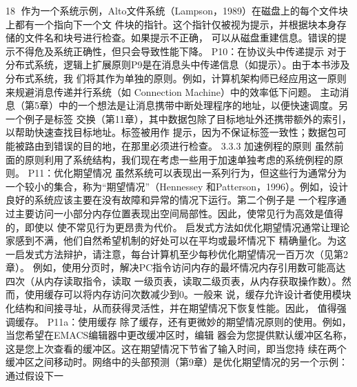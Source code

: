                                                   18
作为一个系统示例，Alto文件系统（Lampson，1989）在磁盘上的每个文件块上都有一个指向下一个文
件块的指针。这个指针仅被视为提示，并根据块本身存储的文件名和块号进行检查。如果提示不正确，
可以从磁盘重建信息。错误的提示不得危及系统正确性，但只会导致性能下降。
P10：在协议头中传递提示
对于分布式系统，逻辑上扩展原则P9是在消息头中传递信息（如提示）。由于本书涉及分布式系统，我
们将其作为单独的原则。例如，计算机架构师已经应用这一原则来规避消息传递并行系统（如
Connection Machine）中的效率低下问题。
主动消息（第5章）中的一个想法是让消息携带中断处理程序的地址，以便快速调度。另一个例子是标签
交换（第11章），其中数据包除了目标地址外还携带额外的索引，以帮助快速查找目标地址。标签被用作
提示，因为不保证标签一致性；数据包可能被路由到错误的目的地，在那里必须进行检查。
3.3.3 加速例程的原则
虽然前面的原则利用了系统结构，我们现在考虑一些用于加速单独考虑的系统例程的原则。
P11：优化期望情况
虽然系统可以表现出一系列行为，但这些行为通常分为一个较小的集合，称为“期望情况”（Hennessey
和Patterson，1996）。例如，设计良好的系统应该主要在没有故障和异常的情况下运行。第二个例子是
一个程序通过主要访问一小部分内存位置表现出空间局部性。因此，使常见行为高效是值得的，即使以
使不常见行为更昂贵为代价。
启发式方法如优化期望情况通常让理论家感到不满，他们自然希望机制的好处可以在平均或最坏情况下
精确量化。为这一启发式方法辩护，请注意，每台计算机至少每秒优化期望情况一百万次（见第2章）。
例如，使用分页时，解决PC指令访问内存的最坏情况内存引用数可能高达四次（从内存读取指令，读取
一级页表，读取二级页表，从内存获取操作数）。然而，使用缓存可以将内存访问次数减少到0。一般来
说，缓存允许设计者使用模块化结构和间接寻址，从而获得灵活性，并在期望情况下恢复性能。因此，
值得强调缓存。
P11a：使用缓存
除了缓存，还有更微妙的期望情况原则的使用。例如，当您希望在EMACS编辑器中更改缓冲区时，编辑
器会为您提供默认缓冲区名称，这是您上次查看的缓冲区。这在期望情况下节省了输入时间，即当您持
续在两个缓冲区之间移动时。网络中的头部预测（第9章）是优化期望情况的另一个示例：通过假设下一

